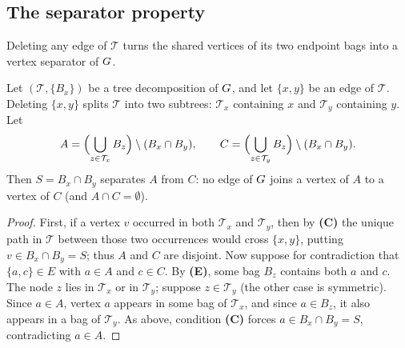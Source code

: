 \subsection{The separator property}

Deleting any edge of $\mathcal{T}$ turns the shared vertices of its two endpoint
bags into a vertex separator of $G$.

\begin{lemma}
\label{ch24:lem-separator}
Let $(\mathcal{T},\{B_x\})$ be a tree decomposition of $G$, and let
$\{x,y\}$ be an edge of $\mathcal{T}$. Deleting $\{x,y\}$ splits $\mathcal{T}$
into two subtrees: $\mathcal{T}_x$ containing $x$ and $\mathcal{T}_y$ containing $y$. Let
\[
  A = \Bigl(\bigcup_{z\in\mathcal{T}_x} B_z\Bigr)\setminus (B_x\cap B_y),
  \qquad
  C = \Bigl(\bigcup_{z\in\mathcal{T}_y} B_z\Bigr)\setminus (B_x\cap B_y).
\]
Then $S = B_x\cap B_y$ separates $A$ from $C$: no edge of $G$ joins a vertex
of $A$ to a vertex of $C$ (and $A\cap C=\emptyset$).
\end{lemma}

\begin{proof}
First, if a vertex $v$ occurred in both $\mathcal{T}_x$ and $\mathcal{T}_y$, then
by \textbf{(C)} the unique path in $\mathcal{T}$ between those two occurrences
would cross $\{x,y\}$, putting $v\in B_x\cap B_y = S$; thus $A$ and $C$ are disjoint.
Now suppose for contradiction that $\{a,c\}\in E$ with $a\in A$ and $c\in C$. By \textbf{(E)},
some bag $B_z$ contains both $a$ and $c$. The node $z$ lies in $\mathcal{T}_x$ or
in $\mathcal{T}_y$; suppose $z\in\mathcal{T}_y$ (the other case is symmetric). Since
$a\in A$, vertex $a$ appears in some bag of $\mathcal{T}_x$, and since $a\in B_z$, it also
appears in a bag of $\mathcal{T}_y$. As above, condition \textbf{(C)} forces $a\in B_x\cap B_y=S$,
contradicting $a\in A$.
\end{proof}

